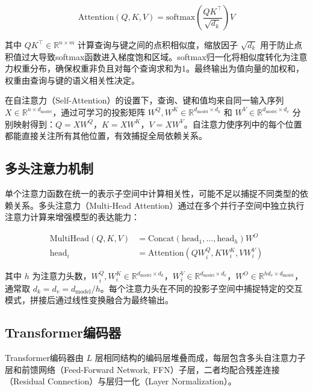 \begin{equation}
\text{Attention}(Q, K, V) = \text{softmax}\left(\frac{QK^\top}{\sqrt{d_k}}\right)V
\end{equation}

其中 $QK^\top \in \mathbb{R}^{n \times m}$ 计算查询与键之间的点积相似度，缩放因子 $\sqrt{d_k}$ 用于防止点积值过大导致softmax函数进入梯度饱和区域。softmax归一化将相似度转化为注意力权重分布，确保权重非负且对每个查询求和为1。最终输出为值向量的加权和，权重由查询与键的语义相关性决定。

在自注意力（Self-Attention）的设置下，查询、键和值均来自同一输入序列 $X \in \mathbb{R}^{n \times d_{\text{model}}}$，通过可学习的投影矩阵 $W^Q, W^K \in \mathbb{R}^{d_{\text{model}} \times d_k}$ 和 $W^V \in \mathbb{R}^{d_{\text{model}} \times d_v}$ 分别映射得到：$Q = XW^Q$，$K = XW^K$，$V = XW^V$。自注意力使序列中的每个位置都能直接关注所有其他位置，有效捕捉全局依赖关系。

\subsection{多头注意力机制}

单个注意力函数在统一的表示子空间中计算相关性，可能不足以捕捉不同类型的依赖关系。多头注意力（Multi-Head Attention）通过在多个并行子空间中独立执行注意力计算来增强模型的表达能力：

\begin{align}
\text{MultiHead}(Q, K, V) &= \text{Concat}(\text{head}_1, \ldots, \text{head}_h)W^O \\
\text{head}_i &= \text{Attention}(QW_i^Q, KW_i^K, VW_i^V)
\end{align}

其中 $h$ 为注意力头数，$W_i^Q, W_i^K \in \mathbb{R}^{d_{\text{model}} \times d_k}$，$W_i^V \in \mathbb{R}^{d_{\text{model}} \times d_v}$，$W^O \in \mathbb{R}^{hd_v \times d_{\text{model}}}$，通常取 $d_k = d_v = d_{\text{model}} / h$。每个注意力头在不同的投影子空间中捕捉特定的交互模式，拼接后通过线性变换融合为最终输出。

\subsection{Transformer编码器}

Transformer编码器由 $L$ 层相同结构的编码层堆叠而成，每层包含多头自注意力子层和前馈网络（Feed-Forward Network, FFN）子层，二者均配合残差连接（Residual Connection）\cite{he2016deep}与层归一化（Layer Normalization）\cite{ba2016layer}。

